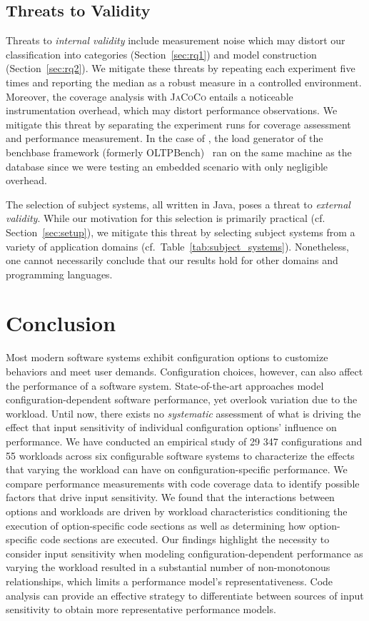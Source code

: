 \subsection{Threats to Validity}\label{sec:threats}
Threats to \emph{internal validity} include measurement noise which may distort our classification into categories (Section~\ref{sec:rq1}) and model construction (Section~\ref{sec:rq2}). We mitigate these threats by repeating each experiment five times and reporting the median as a robust measure in a controlled environment. %
Moreover, the coverage analysis with \mbox{\textsc{JaCoCo}} entails a noticeable instrumentation overhead, which may distort performance observations. We mitigate this threat by separating the experiment runs for coverage assessment and performance measurement. In the case of \htwo, the load generator of the \textsf{benchbase} framework (formerly \textsf{OLTPBench})~\cite{difallah_oltp_2013} ran on the same machine as the database since we were testing an embedded scenario with only negligible overhead.

The selection of subject systems, all written in Java, poses a threat to \emph{external validity}. While our motivation for this selection is primarily practical (cf. Section~\ref{sec:setup}), we mitigate this threat by selecting subject systems from a variety of application domains (cf.~Table~\ref{tab:subject_systems}). Nonetheless, one cannot necessarily conclude that our results hold for other domains and programming languages. 

\section{Conclusion}\label{sec:conclusion}
Most modern software systems exhibit configuration options to customize behaviors and meet user demands. Configuration choices, however, can also affect the performance of a software system.
State-of-the-art approaches model configuration-dependent software performance, yet overlook variation due to the workload. Until now, there exists no \textit{systematic} assessment of what is driving the effect that input sensitivity of individual configuration options’ influence on performance. We have conducted an empirical study of 29 347 configurations and 55 workloads across six configurable software systems to characterize the effects that varying the workload can have on configuration-specific performance. We compare performance measurements with code coverage data to identify possible factors that drive input sensitivity. We found that the interactions between options and workloads are driven by workload characteristics conditioning the execution of option-specific code sections as well as determining how option-specific code sections are executed. Our findings highlight the necessity to consider input sensitivity when modeling configuration-dependent performance as varying the workload resulted in a substantial number of non-monotonous relationships, which limits a performance model's representativeness. Code analysis can provide an effective strategy to differentiate between sources of input sensitivity to obtain more representative performance models.


